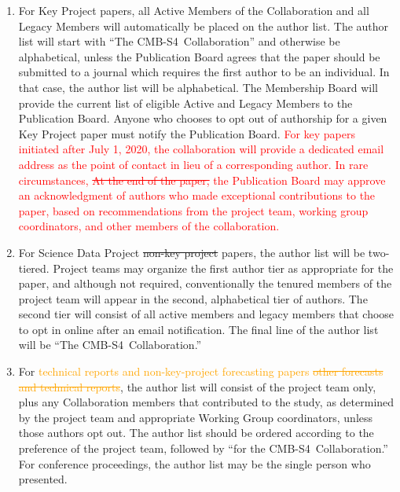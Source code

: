 \documentclass[12pt]{article}
\newcommand\collabname{CMB-S4}
\newcommand{\revision}[1]{\textcolor{Red}{#1}}
\newcommand{\revtwo}[1]{\textcolor{Emerald}{#1}}
\newcommand{\revthree}[1]{\textcolor{Orange}{#1}}
\begin{document}
\begin{enumerate}
\item For Key Project papers, all Active Members of the Collaboration and all Legacy Members will automatically be placed on the author list.  The author list will start with ``The \collabname\ Collaboration'' and otherwise be alphabetical, unless the Publication Board agrees that the paper should be submitted to a journal which requires the first author to be an individual.  In that case, the author list will be alphabetical.
  The Membership Board will provide the current list of eligible Active and Legacy Members to the Publication Board. Anyone who chooses to opt out of authorship for a given Key Project paper must  notify the Publication Board.
  \revision{
\revtwo{For key papers initiated after July 1, 2020,}
    the collaboration will provide a dedicated email address as the point of contact in lieu of a corresponding author.  \revtwo{In rare circumstances,  \sout{At the end of the paper,}} the Publication Board may approve an acknowledgment of authors who made exceptional contributions to the paper, based on recommendations from the project team, working group coordinators, and other members of the collaboration.
    } 
\item For \revtwo{Science Data Project \sout{non-key project}} papers, the author list will be two-tiered.
  Project teams may organize the first author tier as appropriate for the paper, and although not required, conventionally the tenured members of the project team will appear in the second, alphabetical tier of authors.
  The second tier will consist of all active members and legacy members that choose to opt in online after an email notification.  The final line of the author list will be ``The \collabname\ Collaboration.''
  \item For \revthree{technical reports and non-key-project forecasting papers \sout{other forecasts and technical reports}}, the author list will consist of the project team only, plus any Collaboration members that contributed to the study, as determined by the project team and appropriate Working Group coordinators, unless those authors opt out.  The author list should be ordered according to the preference of the project team, followed by ``for the \collabname\ Collaboration.''  For conference proceedings, the author list may be the single person who presented.
\end{enumerate}
\end{document}
